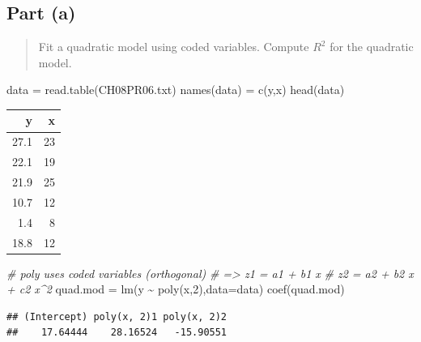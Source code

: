 \documentclass[
]{article}
\newenvironment{Shaded}{\begin{snugshade}}{\end{snugshade}}
\newcommand{\AttributeTok}[1]{\textcolor[rgb]{0.77,0.63,0.00}{#1}}
\newcommand{\CommentTok}[1]{\textcolor[rgb]{0.56,0.35,0.01}{\textit{#1}}}
\newcommand{\DecValTok}[1]{\textcolor[rgb]{0.00,0.00,0.81}{#1}}
\newcommand{\FunctionTok}[1]{\textcolor[rgb]{0.00,0.00,0.00}{#1}}
\newcommand{\NormalTok}[1]{#1}
\newcommand{\OtherTok}[1]{\textcolor[rgb]{0.56,0.35,0.01}{#1}}
\newcommand{\SpecialCharTok}[1]{\textcolor[rgb]{0.00,0.00,0.00}{#1}}
\newcommand{\StringTok}[1]{\textcolor[rgb]{0.31,0.60,0.02}{#1}}
\begin{document}
\hypertarget{part-a-1}{%
\subsection{Part (a)}\label{part-a-1}}

\begin{quote}
Fit a quadratic model using coded variables. Compute \(R^2\) for the
quadratic model.
\end{quote}

\begin{Shaded}
\begin{Highlighting}[]
\NormalTok{data }\OtherTok{=} \FunctionTok{read.table}\NormalTok{(}\StringTok{\textquotesingle{}CH08PR06.txt\textquotesingle{}}\NormalTok{)}
\FunctionTok{names}\NormalTok{(data) }\OtherTok{=} \FunctionTok{c}\NormalTok{(}\StringTok{\textquotesingle{}y\textquotesingle{}}\NormalTok{,}\StringTok{\textquotesingle{}x\textquotesingle{}}\NormalTok{)}
\FunctionTok{head}\NormalTok{(data)}
\end{Highlighting}
\end{Shaded}

\begin{longtable}[]{@{}rr@{}}
\toprule
y & x \\
\midrule
\endhead
27.1 & 23 \\
22.1 & 19 \\
21.9 & 25 \\
10.7 & 12 \\
1.4 & 8 \\
18.8 & 12 \\
\bottomrule
\end{longtable}

\begin{Shaded}
\begin{Highlighting}[]
\CommentTok{\# poly uses coded variables (orthogonal)}
\CommentTok{\#     =\textgreater{} z1 = a1 + b1 x}
\CommentTok{\#        z2 = a2 + b2 x + c2 x\^{}2}
\NormalTok{quad.mod }\OtherTok{=} \FunctionTok{lm}\NormalTok{(y }\SpecialCharTok{\textasciitilde{}} \FunctionTok{poly}\NormalTok{(x,}\DecValTok{2}\NormalTok{),}\AttributeTok{data=}\NormalTok{data)}
\FunctionTok{coef}\NormalTok{(quad.mod)}
\end{Highlighting}
\end{Shaded}

\begin{verbatim}
## (Intercept) poly(x, 2)1 poly(x, 2)2 
##    17.64444    28.16524   -15.90551
\end{verbatim}
\end{document}
